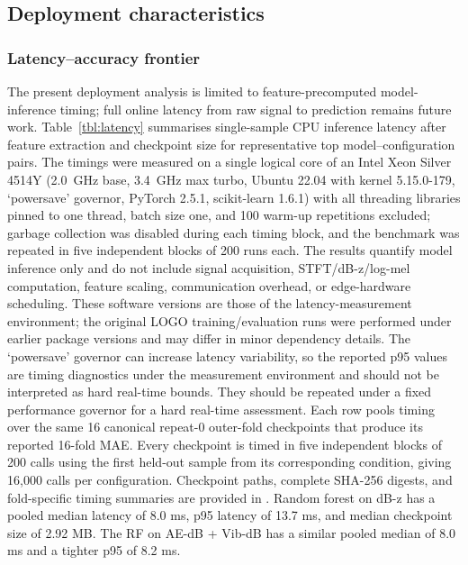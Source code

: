 

\subsection{Deployment
characteristics}\label{deployment-characteristics}

\subsubsection{Latency--accuracy frontier}\label{sec:latency-accuracy}

The present deployment analysis is limited to feature-precomputed
model-inference timing; full online latency from raw signal to prediction
remains future work. Table~\ref{tbl:latency} summarises single-sample CPU
inference latency after feature extraction and
checkpoint size for representative top model--configuration pairs. The
timings were measured on a single logical core of an Intel Xeon Silver
4514Y (2.0~GHz base, 3.4~GHz max turbo, Ubuntu 22.04 with kernel
5.15.0-179, `powersave' governor, PyTorch 2.5.1, scikit-learn 1.6.1) with
all threading libraries pinned to one thread, batch size one, and 100 warm-up repetitions excluded; garbage collection was disabled during each timing block, and the benchmark was repeated in five independent blocks of 200 runs each. The results quantify model inference only and do not include signal acquisition, STFT/dB-z/log-mel computation, feature scaling, communication overhead, or edge-hardware scheduling. These
software versions are those
of the latency-measurement environment; the original LOGO
training/evaluation runs were performed under earlier package versions
and may differ in minor dependency details. The `powersave' governor can
increase latency variability, so the reported p95 values are timing
diagnostics under the measurement environment and should not be
interpreted as hard real-time bounds. They should be repeated under a fixed
performance governor for a hard real-time assessment. Each row pools timing
over the same 16 canonical repeat-0 outer-fold checkpoints that produce its
reported 16-fold MAE. Every checkpoint is timed in five independent blocks of
200 calls using the first held-out sample from its corresponding condition,
giving 16,000 calls per configuration. Checkpoint paths, complete SHA-256
digests, and fold-specific timing summaries are provided in
. Random forest on dB-z has
a pooled median latency of 8.0 ms, p95 latency of 13.7 ms, and median
checkpoint size of 2.92 MB. The RF on AE-dB + Vib-dB has a similar pooled
median of 8.0 ms and a tighter p95 of 8.2 ms.


